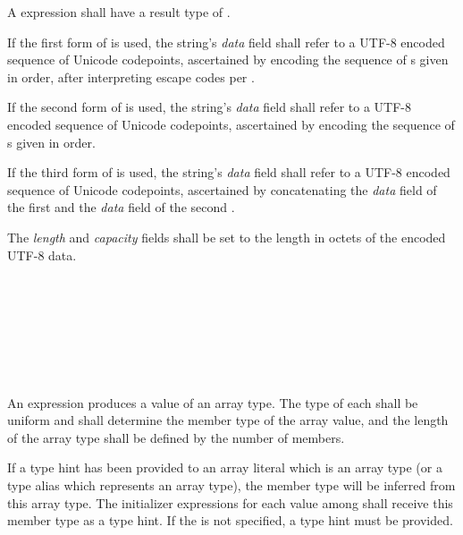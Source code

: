 \specsubsubitem
A  expression shall have a result type of
 .

\specsubsubitem
If the first form of  is used, the string's
\textit{data} field shall refer to a \hbox{UTF-8} encoded sequence of Unicode
codepoints, ascertained by encoding the sequence of s
given in order, after interpreting escape codes per
.

\specsubsubitem
If the second form of  is used, the string's
\textit{data} field shall refer to a \hbox{UTF-8} encoded sequence of Unicode
codepoints, ascertained by encoding the sequence of
s given in order.

\specsubsubitem
If the third form of  is used, the string's
\textit{data} field shall refer to a \hbox{UTF-8} encoded sequence of Unicode
codepoints, ascertained by concatenating the \textit{data} field of the first
 and the \textit{data} field of the second
.

\specsubsubitem
The \textit{length} and \textit{capacity} fields shall be set to the length in
octets of the encoded \hbox{UTF-8} data.


\begin{grammar}
 \\
	\terminal{[}  \terminal{]} \\

 \\
	 \optional{\terminal{,}} \\
	  \optional{\terminal{,}} \\
	 \terminal{,}  \\
\end{grammar}

\specsubsubitem
An  expression produces a value of an array type.
The type of each  shall be uniform and shall
determine the member type of the array value, and the length of the array type
shall be defined by the number of members.

\specsubsubitem
If a type hint has been provided to an array literal which is an array type (or
a type alias which represents an array type), the member type will be inferred
from this array type. The initializer expressions for each value among
 shall receive this member type as a type hint. If
the  is not specified, a type hint must be provided.

